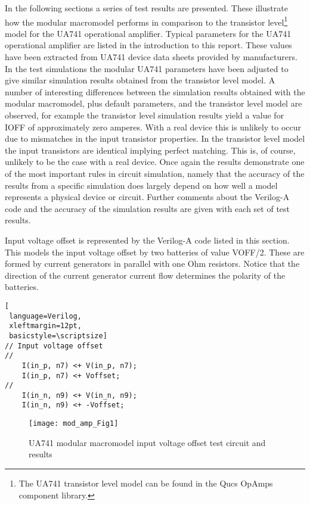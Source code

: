 In the following sections a series of test results are presented.
These illustrate how the modular macromodel performs in comparison to
the transistor level\footnote{The UA741 transistor level model can be
found in the Qucs OpAmps component library. } model for the UA741
operational amplifier.  Typical parameters for the UA741 operational
amplifier are listed in the introduction to this report.  These values
have been extracted from UA741 device data sheets provided by
manufacturers.  In the test simulations the modular UA741 parameters
have been adjusted to give similar simulation results obtained from
the transistor level model.  A number of interesting differences
between the simulation results obtained with the modular macromodel,
plus default parameters, and the transistor level model are observed,
for example the transistor level simulation results yield a value for
IOFF of approximately zero amperes.  With a real device this is
unlikely to occur due to mismatches in the input transistor
properties.  In the transistor level model the input transistors are
identical implying perfect matching.  This is, of course, unlikely to
be the case with a real device. Once again the results demonstrate one
of the most important rules in circuit simulation, namely that the
accuracy of the results from a specific simulation does largely depend
on how well a model represents a physical device or circuit.  Further
comments about the Verilog-A code and the accuracy of the simulation
results are given with each set of test results.



Input voltage offset is represented by the Verilog-A code listed in
this section.  This models the input voltage offset by two batteries
of value VOFF/2. These are formed by current generators in parallel
with one Ohm resistors.  Notice that the direction of the current
generator current flow determines the polarity of the batteries.


\begin{lstlisting}[
 language=Verilog, 
 xleftmargin=12pt,
 basicstyle=\scriptsize]
// Input voltage offset
//
    I(in_p, n7) <+ V(in_p, n7);
    I(in_p, n7) <+ Voffset;
//
    I(in_n, n9) <+ V(in_n, n9);
    I(in_n, n9) <+ -Voffset;
\end{lstlisting}

 
\begin{figure} [here]
  \centering
  \texttt{[image: mod\_amp\_Fig1]}
  \caption{UA741 modular macromodel input voltage offset test circuit and results}
  \label{fig:mod_amp1}
\end{figure} 

